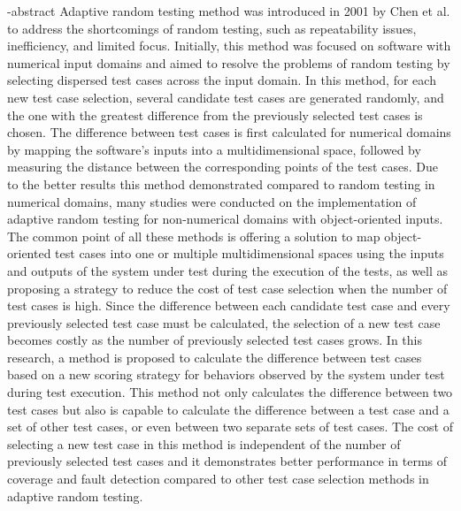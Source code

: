 
\en-abstract{
Adaptive random testing method was introduced in 2001 by Chen et al. to address the shortcomings of random testing, such as repeatability issues, inefficiency, and limited focus. Initially, this method was focused on software with numerical input domains and aimed to resolve the problems of random testing by selecting dispersed test cases across the input domain.
In this method, for each new test case selection, several candidate test cases are generated randomly, and the one with the greatest difference from the previously selected test cases is chosen. The difference between test cases is first calculated for numerical domains by mapping the software's inputs into a multidimensional space, followed by measuring the distance between the corresponding points of the test cases.
Due to the better results this method demonstrated compared to random testing in numerical domains, many studies were conducted on the implementation of adaptive random testing for non-numerical domains with object-oriented inputs. The common point of all these methods is offering a solution to map object-oriented test cases into one or multiple multidimensional spaces using the inputs and outputs of the system under test during the execution of the tests, as well as proposing a strategy to reduce the cost of test case selection when the number of test cases is high. Since the difference between each candidate test case and every previously selected test case must be calculated, the selection of a new test case becomes costly as the number of previously selected test cases grows.
In this research, a method is proposed to calculate the difference between test cases based on a new scoring strategy for behaviors observed by the system under test during test execution. This method not only calculates the difference between two test cases but also is capable to calculate the difference between a test case and a set of other test cases, or even between two separate sets of test cases. The cost of selecting a new test case in this method is independent of the number of previously selected test cases and it demonstrates better performance in terms of coverage and fault detection compared to other test case selection methods in adaptive random testing.
}
